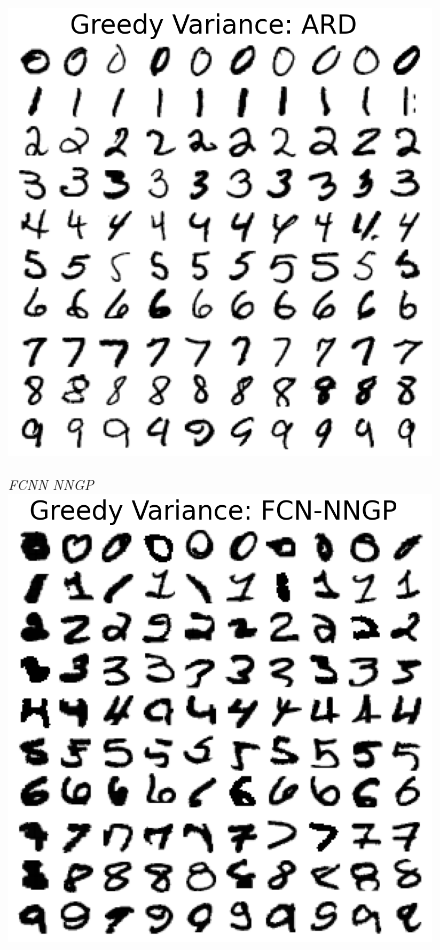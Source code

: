 \documentclass{article}
\numberwithin{equation}{section}
\begin{document}
\begin{figure}[h!]
\begin{minipage}{.25\textwidth}
  \includegraphics[width=\linewidth, trim={0 0 0 1.5cm},clip]{thesis-report/figures/mnist_inducing_point/greedy_mnist_ard_inducing_point_selection.png}
\end{minipage}%
\begin{minipage}{.25\textwidth}
  \centering
  \textit{FCNN NNGP}
  \includegraphics[width=\linewidth, trim={0 0 0 1.5cm},clip]{thesis-report/figures/mnist_inducing_point/greedy_mnist_fcn_nngp_inducing_point_selection.png}

\end{minipage}
\end{figure}
\end{document}
